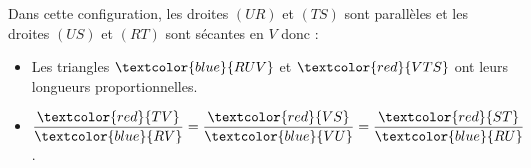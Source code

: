 \begin{corrige}
\begin{enumerate}
            Dans cette configuration, les droites $(UR)$ et $(TS)$ sont parallèles et les droites $(US)$ et $(RT)$
            sont sécantes en $V$ donc :            

            \begin{itemize}
                \item Les triangles $\textcolor{blue}{RUV}$ et $\textcolor{red}{VTS}$ ont leurs longueurs proportionnelles.
                
                \item $\dfrac{\textcolor{red}{TV}}{\textcolor{blue}{RV}}=\dfrac{\textcolor{red}{VS}}{\textcolor{blue}{VU}}=\dfrac{\textcolor{red}{ST}}{\textcolor{blue}{RU}}$.
            \end{itemize}  
        \end{enumerate}
\end{corrige}

